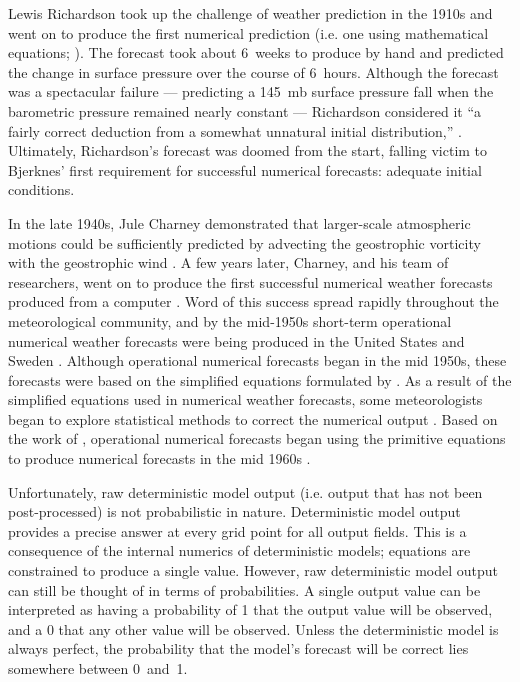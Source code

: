 Lewis Richardson took up the challenge of weather prediction in the 1910s and went on to produce the first numerical prediction (i.e. one using mathematical equations; \citealp{Lynch2008}).
The forecast took about \mbox{6 weeks} to produce by hand and predicted the change in surface pressure over the course of \mbox{6 hours}.
Although the forecast was a spectacular failure --- predicting a \mbox{145 mb} surface pressure fall when the barometric pressure remained nearly constant --- Richardson considered it ``a fairly correct deduction from a somewhat unnatural initial distribution,'' \citep{Lynch2008}.
Ultimately, Richardson's forecast was doomed from the start, falling victim to Bjerknes' first requirement for successful numerical forecasts: adequate initial conditions.


In the late 1940s, Jule Charney demonstrated that larger-scale atmospheric motions could be sufficiently predicted by advecting the geostrophic vorticity with the geostrophic wind \citep{Charney1947}.
A few years later, Charney, and his team of researchers, went on to produce the first successful numerical weather forecasts produced from a computer \citep{Charney1950}.
Word of this success spread rapidly throughout the meteorological community, and by the mid-1950s short-term operational numerical weather forecasts were being produced in the United States and Sweden \citep{Lewis2005}.
Although operational numerical forecasts began in the mid 1950s, these forecasts were based on the simplified equations formulated by \cite{Charney1947}.
As a result of the simplified equations used in numerical weather forecasts, some meteorologists began to explore statistical methods to correct the numerical output \citep{Gleeson1961}.
Based on the work of \cite{Hinkelmann1951}, operational numerical forecasts began using the primitive equations to produce numerical forecasts in the mid 1960s \citep{Lynch2008}.


Unfortunately, raw deterministic model output (i.e. output that has not been post-processed) is not probabilistic in nature.
Deterministic model output provides a precise answer at every grid point for all output fields.
This is a consequence of the internal numerics of deterministic models; equations are constrained to produce a single value.
However, raw deterministic model output can still be thought of in terms of probabilities.
A single output value can be interpreted as having a probability of 1 that the output value will be observed, and a 0 that any other value will be observed.
Unless the deterministic model is always perfect, the probability that the model's forecast will be correct lies somewhere between \mbox{0 and 1}.


